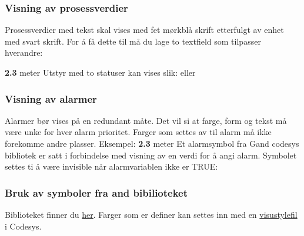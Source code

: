 \subsubsection{Visning av prosessverdier}

Prosessverdier med tekst skal vises med fet mørkblå skrift etterfulgt av enhet med svart skrift. For å få dette til må du lage to textfield som tilpasser hverandre:

\vskip 5pt 

\textbf{\textcolor[HTML]{0000D7}{2.3}} meter
\vskip 1cm 
Utstyr med to statuser kan vises slik:
\vskip 5pt 
eller
\subsubsection{Visning av alarmer}
Alarmer bør vises på en redundant måte. Det vil si at farge, form og tekst må være unke for hver alarm prioritet. 
Farger som settes av til alarm må ikke forekomme andre plasser. 
\vskip 5pt 
Eksempel:
\vskip 5pt 
 \textbf{\textcolor[HTML]{0000D7}{2.3}} meter
\vskip 5pt 
Et alarmsymbol fra Gand codesys bibliotek er satt i forbindelse med visning av en verdi for å angi alarm. Symbolet settes ti å være invisible når alarmvariablen ikke er TRUE:
\subsubsection{Bruk av symboler fra and bibilioteket}
Biblioteket finner du \href{https://rfka-my.sharepoint.com/:u:/g/personal/fred-olav_mosdal_skole_rogfk_no/EZycS5I7-ZdGjaCqIlRDeAoB0iXKpeeXCMJg4WflkLV-Sg?e=Hi4A6N}{her}. Farger som er definer kan settes inn med en \href{https://rfka-my.sharepoint.com/:u:/g/personal/fred-olav_mosdal_skole_rogfk_no/EfmBwSFs6PZCh73dTYgoGZMBGHH9Ros14TSsgv9RhuAsAA?e=EnMdNi}{visustylefil} i Codesys. 

